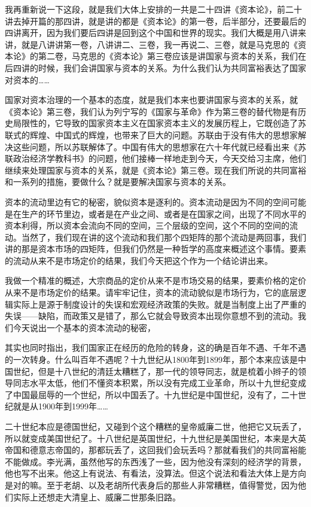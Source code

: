 \documentclass[UTF8, 12pt, a4paper]{ctexrep}
\begin{document}
我再重新说一下这段，就是我们大体上安排的一共是二十四讲《资本论》，前二十讲去掉开篇的那四讲，就是讲的都是《资本论》的第一卷，后半部分，还要最后的四讲离开，因为我们要后四讲是回到这个中国和世界的现实。我们大概是用八讲来讲，就是八讲讲第一卷，八讲讲二、三卷，我一再说二、三卷，就是马克思的《资本论》的第二卷，马克思的《资本论》第三卷应该是讲国家与资本的关系，我们在后四讲的时候，我们会讲国家与资本的关系。为什么我们认为共同富裕表达了国家对资本的……

国家对资本治理的一个基本的态度，就是我们本来也要讲国家与资本的关系，就《资本论》第三卷，我们认为列宁写的《国家与革命》作为第三卷的替代物是有历史局限性的，它导致的国家资本主义在国家资本主义的发展历程上，它既创造了苏联式的辉煌、中国式的辉煌，也带来了巨大的问题。苏联由于没有伟大的思想家解决这些问题，所以苏联解体了。中国有伟大的思想家在六十年代就已经看出来《苏联政治经济学教科书》的问题，他们接棒一样地走到今天，今天交给习主席，他们继续来处理国家与资本的关系，就是《资本论》第三卷。现在我们所说的共同富裕和一系列的措施，要做什么？就是要解决国家与资本的关系。

资本的流动里边有它的秘密，貌似资本是逐利的。资本流动是因为不同的空间可能是在生产的环节里边，或者是在产业之间、或者是在国家之间，出现了不同水平的资本利得，所以资本会流向不同的空间，三个层级的空间，这个不同的空间的流动。当然了，我们现在讲的这个流动和我们那个四矩阵的那个流动是两回事，我们讲的那是资本市场的四矩阵，但我们仍然是一种哲学的高度来概述这个事情。要素的流动从来不是市场定价的结果，我们今天把这个作为一个结论讲出来。

我做一个精准的概述，大宗商品的定价从来不是市场交易的结果，要素价格的定价从来不是市场定价的结果。请牢牢记住，资本的流动貌似是市场行为，它的底层逻辑实际上是源于制度设计的失误和宏观经济政策的失败。就是当制度上出了严重的失误——缺陷，而政策又是错了，那么它就会导致资本出现你意想不到的流动。我们今天说出一个基本的资本流动的秘密，

其实也同时指出，我们国家正在经历的危险的转身，这的确是百年不遇、千年不遇的一次转身。什么叫百年不遇呢？十九世纪从1800年到1899年，那个本来应该是中国世纪，但是十八世纪的清廷太糟糕了，那一代的领导同志，就是梳着小辫子的领导同志水平太低，他们不懂资本积累，所以没有完成工业革命，所以十九世纪变成了中国最屈辱的一个世纪，所以中国丢了。十九世纪是中国世纪，没有了，二十世纪就是从1900年到1999年……

二十世纪本应是德国世纪，又碰到个这个糟糕的皇帝威廉二世，他把它又玩丢了，所以就变成美国世纪了。十八世纪是英国世纪，十九世纪是美国世纪，本来是大英帝国和德意志帝国的，那都玩丢了，这回我们会玩丢吗？那就看我们的共同富裕能不能做成。李光满，虽然他写的东西浅了一些，因为他没有深刻的经济学的背景，他也写不出来。他这上有说法、有看法，没算法。但这个说法和看法大体上是方向是对的嘛。至于老胡、以及老胡所代表身后的那些人非常糟糕，值得警觉，因为他们实际上还想走大清皇上、威廉二世那条旧路。
\end{document}
